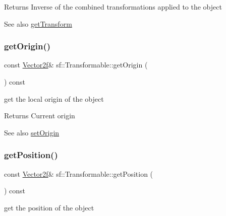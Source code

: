 \begin{DoxyReturn}{Returns}
Inverse of the combined transformations applied to the object
\end{DoxyReturn}
\begin{DoxySeeAlso}{See also}
\hyperlink{classsf_1_1_transformable_a7f7c3f0bab3f162b13613904fbdbb9ad}{get\+Transform} 
\end{DoxySeeAlso}
\mbox{\label{classsf_1_1_transformable_a37ea3500afac234814a43ce809ef264e}} 
\subsubsection{\texorpdfstring{get\+Origin()}{getOrigin()}}
{\footnotesize\ttfamily const \hyperlink{classsf_1_1_vector2}{Vector2f}\& sf\+::\+Transformable\+::get\+Origin (\begin{DoxyParamCaption}{ }\end{DoxyParamCaption}) const}



get the local origin of the object 

\begin{DoxyReturn}{Returns}
Current origin
\end{DoxyReturn}
\begin{DoxySeeAlso}{See also}
\hyperlink{classsf_1_1_transformable_a56c67bd80aae8418d13fb96c034d25ec}{set\+Origin} 
\end{DoxySeeAlso}
\mbox{\label{classsf_1_1_transformable_a73f9739bc6e74db2cea154bc8e94ec46}} 
\subsubsection{\texorpdfstring{get\+Position()}{getPosition()}}
{\footnotesize\ttfamily const \hyperlink{classsf_1_1_vector2}{Vector2f}\& sf\+::\+Transformable\+::get\+Position (\begin{DoxyParamCaption}{ }\end{DoxyParamCaption}) const}



get the position of the object 

